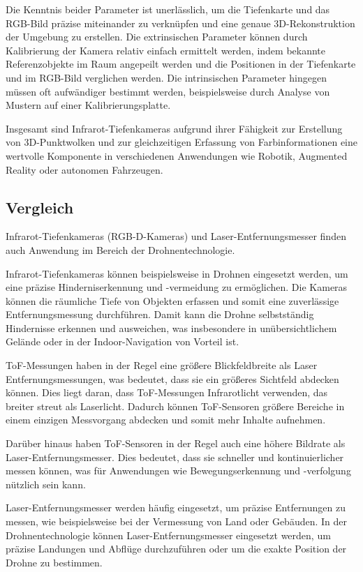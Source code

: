     Die Kenntnis beider Parameter ist unerlässlich, um die Tiefenkarte und das RGB-Bild präzise miteinander zu verknüpfen und eine genaue 3D-Rekonstruktion der Umgebung zu erstellen. Die extrinsischen Parameter können durch Kalibrierung der Kamera relativ einfach ermittelt werden, indem bekannte Referenzobjekte im Raum angepeilt werden und die Positionen in der Tiefenkarte und im RGB-Bild verglichen werden. Die intrinsischen Parameter hingegen müssen oft aufwändiger bestimmt werden, beispielsweise durch Analyse von Mustern auf einer Kalibrierungsplatte.
    
    Insgesamt sind Infrarot-Tiefenkameras aufgrund ihrer Fähigkeit zur Erstellung von 3D-Punktwolken und zur gleichzeitigen Erfassung von Farbinformationen eine wertvolle Komponente in verschiedenen Anwendungen wie Robotik, Augmented Reality oder autonomen Fahrzeugen. 

    \cite[vgl.][Kapitel 3]{Tychola2022}

\subsection{Vergleich}\label{chp:depth-sensor-compar}
    Infrarot-Tiefenkameras (RGB-D-Kameras) und Laser-Entfernungsmesser finden auch Anwendung im Bereich der Drohnentechnologie.

Infrarot-Tiefenkameras können beispielsweise in Drohnen eingesetzt werden, um eine präzise Hinderniserkennung und -vermeidung zu ermöglichen. Die Kameras können die räumliche Tiefe von Objekten erfassen und somit eine zuverlässige Entfernungsmessung durchführen. Damit kann die Drohne selbstständig Hindernisse erkennen und ausweichen, was insbesondere in unübersichtlichem Gelände oder in der Indoor-Navigation von Vorteil ist.

ToF-Messungen haben in der Regel eine größere Blickfeldbreite als Laser Entfernungsmessungen, was bedeutet, dass sie ein größeres Sichtfeld abdecken können. Dies liegt daran, dass ToF-Messungen Infrarotlicht verwenden, das breiter streut als Laserlicht. Dadurch können ToF-Sensoren größere Bereiche in einem einzigen Messvorgang abdecken und somit mehr Inhalte aufnehmen.

Darüber hinaus haben ToF-Sensoren in der Regel auch eine höhere Bildrate als Laser-Entfernungsmesser. Dies bedeutet, dass sie schneller und kontinuierlicher messen können, was für Anwendungen wie Bewegungserkennung und -verfolgung nützlich sein kann.

Laser-Entfernungsmesser werden häufig eingesetzt, um präzise Entfernungen zu messen, wie beispielsweise bei der Vermessung von Land oder Gebäuden. In der Drohnentechnologie können Laser-Entfernungsmesser eingesetzt werden, um präzise Landungen und Abflüge durchzuführen oder um die exakte Position der Drohne zu bestimmen.




